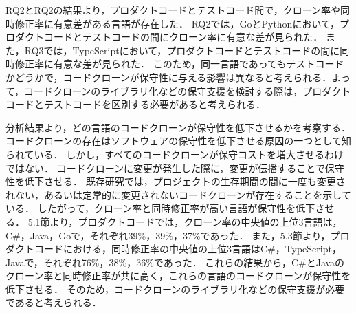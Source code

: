 \documentclass[T,J]{fose}
\begin{document}


RQ2とRQ2の結果より，プロダクトコードとテストコード間で，クローン率や同時修正率に有意差がある言語が存在した．
RQ2では，GoとPythonにおいて，プロダクトコードとテストコードの間にクローン率に有意な差が見られた．
また，RQ3では，TypeScriptにおいて，プロダクトコードとテストコードの間に同時修正率に有意な差が見られた．
このため，同一言語であってもテストコードかどうかで，コードクローンが保守性に与える影響は異なると考えられる．よって，コードクローンのライブラリ化などの保守支援を検討する際は，プロダクトコードとテストコードを区別する必要があると考えられる．


分析結果より，どの言語のコードクローンが保守性を低下させるかを考察する．
コードクローンの存在はソフトウェアの保守性を低下させる原因の一つとして知られている．
しかし，すべてのコードクローンが保守コストを増大させるわけではない．
コードクローンに変更が発生した際に，変更が伝播することで保守性を低下させる．
既存研究では，プロジェクトの生存期間の間に一度も変更されない，あるいは定常的に変更されないコードクローンが存在することを示している\cite{Yamanaka2013}\cite{Goode2011}．
したがって，クローン率と同時修正率が高い言語が保守性を低下させる．
5.1節より，プロダクトコードでは，クローン率の中央値の上位3言語は，C\#，Java，Goで，それぞれ39\%，39\%，37\%であった．
また，5.3節より，プロダクトコードにおける，同時修正率の中央値の上位3言語はC\#，TypeScript，Javaで，それぞれ76\%，38\%，36\%であった．
これらの結果から，C\#とJavaのクローン率と同時修正率が共に高く，これらの言語のコードクローンが保守性を低下させる．
そのため，コードクローンのライブラリ化などの保守支援が必要であると考えられる．
\end{document}
